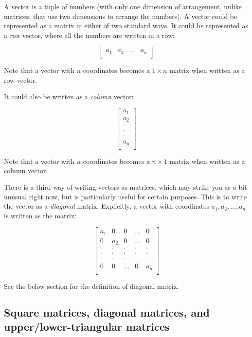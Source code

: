 \documentclass[10pt]{amsart}
\begin{document}
A vector is a tuple of numbers (with only one dimension of
arrangement, unlike matrices, that use two dimensions to arrange the
numbers). A vector could be represented as a matrix in either of two
standard ways. It could be represented as a {\em row} vector, where
all the numbers are written in a row:

$$\left[\begin{matrix} a_1 & a_2 & \dots & a_n \\\end{matrix} \right]$$

Note that a vector with $n$ coordinates becomes a $1 \times n$ matrix when written as a row vector.

It could also be written as a {\em column} vector:

$$\left[\begin{matrix} a_1 \\ a_2 \\ \cdot \\ \cdot \\ \cdot \\ a_n \\\end{matrix} \right]$$

Note that a vector with $n$ coordinates becomes a $n \times 1$ matrix when written as a column vector.

There is a third way of writing vectors as matrices, which may strike
you as a bit unusual right now, but is particularly useful for certain
purposes. This is to write the vector as a {\em diagonal}
matrix. Explicitly, a vector with coordinates $a_1,a_2,\dots,a_n$ is
written as the matrix:

$$\left[\begin{matrix} a_1 & 0 & 0 & \dots & 0 \\ 0 & a_2 & 0 & \dots & 0 \\ \cdot & \cdot & \cdot & \cdot & \cdot \\ \cdot & \cdot & \cdot & \cdot & \cdot \\ \cdot & \cdot & \cdot & \cdot & \cdot \\ 0 & 0 & \dots & 0 & a_n \\\end{matrix}\right]$$

See the below section for the definition of diagonal matrix.

\subsection{Square matrices, diagonal matrices, and upper/lower-triangular matrices}
\end{document}
